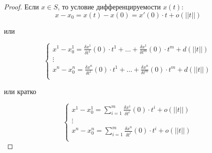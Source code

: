 \documentclass{report}
\theoremstyle{definition}
\begin{document}
\begin{proof}
  Если $x\in S$, то условие дифференцируемости $x(t)$:
  \begin{equation*}
    x-x_0 = x(t) - x(0) = x'(0)\cdot t + o(||t||)
  \end{equation*}
  \begin{center}
    или
  \end{center}
  \begin{equation*}
    \left\{\begin{array}{l}
      x^1 - x^1_0 = \frac{\delta x^1}{\delta t^1}(0)\cdot t^1 + \ldots + \frac{\delta x^1}{\delta t^m}(0)\cdot t^m + d(||t||) \\
      \vdots                                                                                                                  \\
      x^n - x^n_0 = \frac{\delta x^n}{\delta t^1}(0)\cdot t^1 + \ldots + \frac{\delta x^n}{\delta t^m}(0)\cdot t^m + d(||t||) \\
    \end{array}\right.
  \end{equation*}
  \begin{center}
    или кратко
  \end{center}
  \begin{equation}
    \left\{\begin{array}{l}
      x^1 - x^1_0 = \sum_{i=1}^{m}\frac{\delta x^1}{\delta t^i}(0)\cdot t^i + o(||t||) \\
      \vdots                                                                           \\
      x^n - x^n_0 = \sum_{i=1}^{m}\frac{\delta x^n}{\delta t^i}(0)\cdot t^i + o(||t||) \\
    \end{array}\right.
  \end{equation}


\end{proof}
\end{document}
